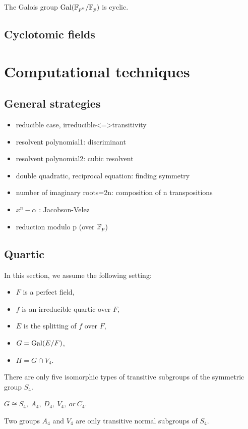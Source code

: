 \documentclass{../exp}
\begin{document}
\begin{thm}
The Galois group $\operatorname{Gal}(\mathbb{F}_{p^n}/\mathbb{F}_p)$ is cyclic.
\end{thm}

\subsection{Cyclotomic fields}










\section{Computational techniques}

\subsection{General strategies}
\begin{itemize}
\item reducible case, irreducible<=>transitivity
\item resolvent polynomial1: discriminant
\item resolvent polynomial2: cubic resolvent
\item double quadratic, reciprocal equation: finding symmetry
\item number of imaginary roots=2n: composition of n transpositions
\item $x^n-\alpha$ :  Jacobson-Velez
\item reduction modulo p (over $\mathbb{F}_p$)
\end{itemize}

\subsection{Quartic}
In this section, we assume the following setting:
\begin{itemize}
\item $F$ is a perfect field, %
\item $f$ is an irreducible quartic over $F$,
\item $E$ is the splitting of $f$ over $F$,
\item $G=\operatorname{Gal}(E/F)$,
\item $H=G\cap V_4$. 
\end{itemize}
\begin{thm}
There are only five isomorphic types of transitive subgroups of the symmetric group $S_4$.
\end{thm}
\begin{cor}
$G\cong S_4,\ A_4,\ D_4,\ V_4,\ or\ C_4$.
\end{cor}
\begin{prop}
Two groups $A_4$ and $V_4$ are only transitive normal subgroups of $S_4$.
\end{prop}
\end{document}
